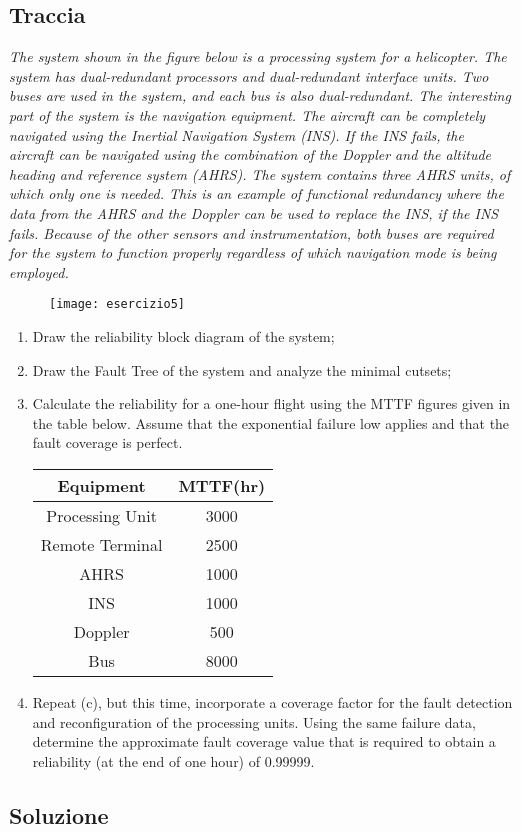 \subsection{Traccia}
\textit{The system shown in the figure below is a processing system for a helicopter. The system
has dual-redundant processors and dual-redundant interface units. Two buses are used in
the system, and each bus is also dual-redundant. The interesting part of the system is the
navigation equipment. The aircraft can be completely navigated using the Inertial
Navigation System (INS). If the INS fails, the aircraft can be navigated using the
combination of the Doppler and the altitude heading and reference system (AHRS). The
system contains three AHRS units, of which only one is needed. This is an example of
functional redundancy where the data from the AHRS and the Doppler can be used to
replace the INS, if the INS fails. Because of the other sensors and instrumentation, both
buses are required for the system to function properly regardless of which navigation mode
is being employed.}

\begin{figure}[!htbp]
  \centering
  \texttt{[image: esercizio5]}
\end{figure}

\begin{enumerate}
  \item Draw the reliability block diagram of the system;
  \item Draw the Fault Tree of the system and analyze the minimal cutsets;
  \item Calculate the reliability for a one-hour flight using the MTTF figures given in the table
  below. Assume that the exponential failure low applies and that the fault coverage is perfect.

  \begin{center}
  \begin{tabular}{|c|c|}
  	\hline
  	\textbf{Equipment} & \textbf{MTTF(hr)} \\
  	\hline
  	Processing Unit  & 3000 \\
  	\hline
  	Remote Terminal  & 2500 \\
  	\hline
  	AHRS & 1000 \\
  	\hline
  	INS & 1000 \\
  	\hline
  	Doppler & 500 \\
  	\hline
  	Bus & 8000 \\
  	\hline
  \end{tabular}
  \end{center}

  \item Repeat (c), but this time, incorporate a coverage factor for the fault
  detection and reconfiguration of the processing units. Using the same failure
  data, determine the approximate fault coverage value that is required to obtain
  a reliability (at the end of one hour) of 0.99999.
\end{enumerate}

\clearpage
\subsection{Soluzione}
